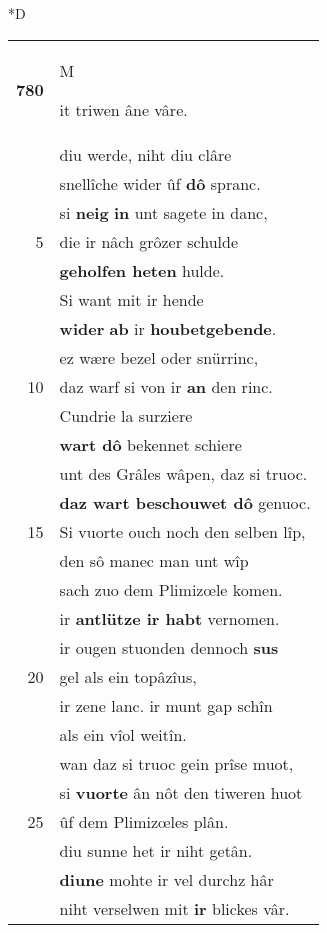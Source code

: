 \documentclass[8pt,a4paper,notitlepage]{article}
\begin{document}
\begin{table}[ht]
\begin{minipage}[t]{0.5\linewidth}
\small
\begin{center}*D
\end{center}
\begin{tabular}{rl}
\textbf{780} & \begin{large}M\end{large}it triwen âne vâre.\\ 
 & diu werde, niht diu clâre\\ 
 & snellîche wider ûf \textbf{dô} spranc.\\ 
 & si \textbf{neig} \textbf{in} unt sagete in danc,\\ 
5 & die ir nâch grôzer schulde\\ 
 & \textbf{geholfen heten} hulde.\\ 
 & Si want mit ir hende\\ 
 & \textbf{wider} \textbf{ab} ir \textbf{houbetgebende}.\\ 
 & ez wære bezel oder snürrinc,\\ 
10 & daz warf si von ir \textbf{an} den rinc.\\ 
 & Cundrie la surziere\\ 
 & \textbf{wart dô} bekennet schiere\\ 
 & unt des Grâles wâpen, daz si truoc.\\ 
 & \textbf{daz wart beschouwet dô} genuoc.\\ 
15 & Si vuorte ouch noch den selben lîp,\\ 
 & den sô manec man unt wîp\\ 
 & sach zuo dem Plimizœle komen.\\ 
 & ir \textbf{antlütze ir habt} vernomen.\\ 
 & ir ougen stuonden dennoch \textbf{sus}\\ 
20 & gel als ein topâzîus,\\ 
 & ir zene lanc. ir munt gap schîn\\ 
 & als ein vîol weitîn.\\ 
 & wan daz si truoc gein prîse muot,\\ 
 & si \textbf{vuorte} ân nôt den tiweren huot\\ 
25 & ûf dem Plimizœles plân.\\ 
 & diu sunne het ir niht getân.\\ 
 & \textbf{diu}\textbf{ne} mohte ir vel durchz hâr\\ 
 & niht verselwen mit \textbf{ir} blickes vâr.\\ 

\end{tabular}
\end{minipage}
\end{table}
\end{document}
